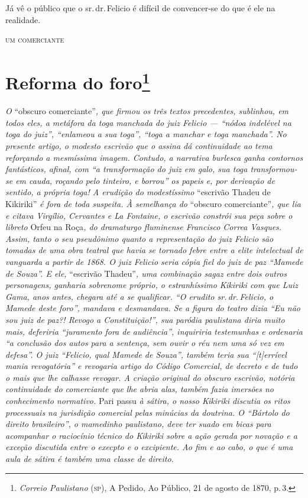 Já vê o público que o sr.\,dr.\,Felicio é difícil de convencer-se do que é
ele na realidade.

\begin{flushright}
\textsc{um comerciante}
\end{flushright}

\chapter{Reforma do foro\footnote{\emph{Correio Paulistano} (\textsc{sp}), A Pedido, Ao Público,
  21 de agosto de 1870, p.\,3.}} %

\begin{didascalia}
\emph{O} ``obscuro comerciante''\emph{, que firmou os três textos
precedentes, sublinhou, em todos eles, a metáfora da toga manchada do
juiz Felicio --- ``nódoa indelével na toga do juiz'', ``enlameou a sua
toga'', ``toga a manchar e toga manchada''. No presente artigo, o modesto
escrivão que o assina dá continuidade ao tema reforçando a mesmíssima
imagem. Contudo, a narrativa burlesca ganha contornos fantásticos,
afinal, com ``a transformação do juiz em galo, sua toga transformou-se em
cauda, roçando pelo tinteiro, e borrou'' os papeis e, por derivação de
sentido, a própria toga! A erudição do modestíssimo} ``escrivão Thadeu de
Kikiriki'' \emph{é fora de toda suspeita. À semelhança do} ``obscuro
comerciante''\emph{, que lia e citava Virgílio, Cervantes e La Fontaine,
o escrivão constrói sua peça sobre o libreto} Orfeu na Roça\emph{, do
dramaturgo fluminense Francisco Correa Vasques. Assim, tanto o seu
pseudônimo quanto a representação do juiz Felicio são tomadas de uma
obra teatral que havia se tornado febre entre a elite intelectual de
vanguarda a partir de 1868. O juiz Felicio seria cópia fiel do juiz de
paz ``Mamede de Souza''. E ele,} ``escrivão Thadeu''\emph{, uma combinação
sagaz entre dois outros personagens, ganharia sobrenome próprio, o
estranhíssimo Kikiriki com que Luiz Gama, anos antes, chegara até a se
qualificar. ``O erudito sr.\,dr.\,Felicio, o Mamede deste foro'', mandava e
desmandava. Se a figura do teatro dizia ``Eu não sou juiz de paz?! Revogo
a Constituição!'', sua paródia paulistana diria muito mais, deferiria
``juramento fora de audiência'', inquiriria testemunhas e ordenaria ``a
conclusão dos autos para a sentença, sem ouvir o réu nem uma só vez em
defesa''. O juiz ``Felicio, qual Mamede de Souza'', também teria sua
``{[}t{]}errível mania revogatória'' e revogaria artigo do Código
Comercial, de decreto e de tudo o mais que lhe calhasse revogar. A
criação original do obscuro escrivão, notória continuidade do
comerciante que lhe abria alas, também fazia imersões no conhecimento
normativo.} Pari passu \emph{à sátira, o nosso Kikiriki discutia os
ritos processuais na jurisdição comercial pelas minúcias da doutrina. O
``Bártolo do direito brasileiro'', o mamedinho paulistano, deve ter suado
em bicas para acompanhar o raciocínio técnico do Kikiriki sobre a ação
gerada por novação e a exceção discutida entre o execpto e o excipiente.
Ao fim e ao cabo, o que é uma aula de sátira é também uma classe de
direito.}
\end{didascalia}

